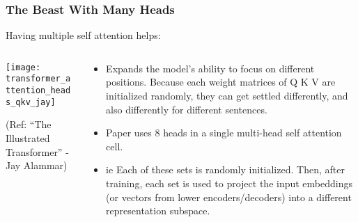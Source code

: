 \begin{frame}[fragile]\frametitle{The Beast With Many Heads}

Having multiple self attention helps:

\begin{columns}
    \begin{column}[T]{0.5\linewidth}
\begin{center}
\texttt{[image: transformer\_attention\_heads\_qkv\_jay]}


{\tiny (Ref: ``The Illustrated Transformer'' - Jay Alammar)}
\end{center}		

		\end{column}
    \begin{column}[T]{0.5\linewidth}

\begin{itemize}
\item Expands the model’s ability to focus on different positions. Because each weight matrices of Q K V are initialized randomly, they can get settled differently, and also differently for different sentences.
\item Paper uses 8 heads in a single multi-head self attention cell.
\item ie Each of these sets is randomly initialized. Then, after training, each set is used to project the input embeddings (or vectors from lower encoders/decoders) into a different representation subspace.
\end{itemize}
    \end{column}
  \end{columns}
\end{frame}

